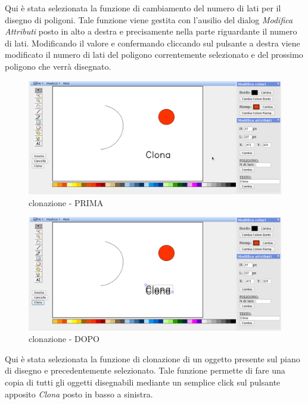 \vspace{100pt}
Qui \`e stata selezionata la funzione di cambiamento del numero di lati per il disegno di poligoni. Tale funzione viene gestita con l'ausilio del dialog \textit{Modifica Attributi} posto in alto a destra e precisamente nella parte riguardante il numero di lati. Modificando il valore e confermando cliccando sul pulsante a destra viene modificato il numero di lati del poligono correntemente selezionato e del prossimo poligono che verr\`a disegnato. \\

\begin{figure}[!ht]
\centering
\includegraphics[scale=0.4]{images/clona.png}
\caption{clonazione  - PRIMA}
\end{figure} 

\begin{figure}[!ht]
\centering
\includegraphics[scale=0.4]{images/clona_dopo.png}
\caption{clonazione  - DOPO}
\end{figure} 

\vspace{100pt}
Qui \`e stata selezionata la funzione di clonazione di un oggetto presente sul piano di disegno e precedentemente selezionato. Tale funzione permette di fare una copia di tutti gli oggetti disegnabili mediante un semplice click sul pulsante apposito \textit{Clona} posto in basso a sinistra. \\

